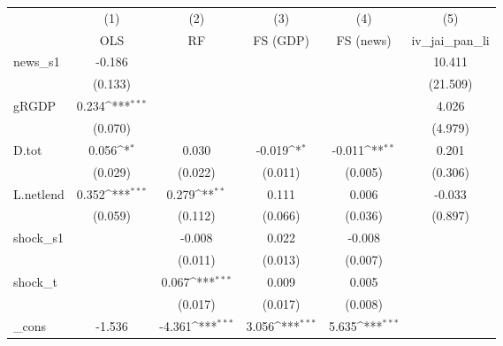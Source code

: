 {
\def\sym#1{\ifmmode^{#1}\else\(^{#1}\)\fi}
\begin{tabular}{l*{5}{c}}
\toprule
            &\multicolumn{1}{c}{(1)}&\multicolumn{1}{c}{(2)}&\multicolumn{1}{c}{(3)}&\multicolumn{1}{c}{(4)}&\multicolumn{1}{c}{(5)}\\
            &\multicolumn{1}{c}{OLS}&\multicolumn{1}{c}{RF}&\multicolumn{1}{c}{FS (GDP)}&\multicolumn{1}{c}{FS (news)}&\multicolumn{1}{c}{iv\_jai\_pan\_li}\\
\midrule
news\_s1     &      -0.186         &                     &                     &                     &      10.411         \\
            &     (0.133)         &                     &                     &                     &    (21.509)         \\
\addlinespace
gRGDP       &       0.234\sym{***}&                     &                     &                     &       4.026         \\
            &     (0.070)         &                     &                     &                     &     (4.979)         \\
\addlinespace
D.tot       &       0.056\sym{*}  &       0.030         &      -0.019\sym{*}  &      -0.011\sym{**} &       0.201         \\
            &     (0.029)         &     (0.022)         &     (0.011)         &     (0.005)         &     (0.306)         \\
\addlinespace
L.netlend   &       0.352\sym{***}&       0.279\sym{**} &       0.111         &       0.006         &      -0.033         \\
            &     (0.059)         &     (0.112)         &     (0.066)         &     (0.036)         &     (0.897)         \\
\addlinespace
shock\_s1    &                     &      -0.008         &       0.022         &      -0.008         &                     \\
            &                     &     (0.011)         &     (0.013)         &     (0.007)         &                     \\
\addlinespace
shock\_t     &                     &       0.067\sym{***}&       0.009         &       0.005         &                     \\
            &                     &     (0.017)         &     (0.017)         &     (0.008)         &                     \\
\addlinespace
\_cons      &      -1.536         &      -4.361\sym{***}&       3.056\sym{***}&       5.635\sym{***}&                     \\

\end{tabular}}
